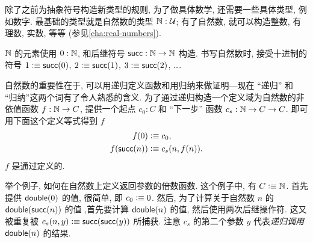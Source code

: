 %
%
%
除了之前为抽象符号构造新类型的规则, 为了做具体数学, 还需要一些具体类型, 例如数字.
最基础的类型就是自然数的类型 $\mathbb{N} : \mathcal{U}$;
有了自然数, 就可以构造整数, 有理数, 实数, 等等 (参见\cref{cha:real-numbers}).

$\mathbb{N}$ 的元素使用 $0 : \mathbb{N}$, 和后继符号 $\mathsf{succ} : \mathbb{N} \to \mathbb{N}$ 构造.
书写自然数时, 接受十进制的符号 $1 \vcentcolon\equiv \mathsf{succ}(0)$, $2 \vcentcolon\equiv \mathsf{succ}(1)$, $3 \vcentcolon\equiv \mathsf{succ}(2)$, \dots.

自然数的重要性在于, 可以用递归定义函数和用归纳来做证明---现在 ``递归'' 和 ``归纳''这两个词有了令人熟悉的含义.
%
为了通过递归构造一个定义域为自然数的非依值函数 $f : \mathbb{N} \to C$, 提供一个起点 $c_0 : C$ 和 ``下一步'' 函数 $c_s : \mathbb{N} \to C \to C$.
即可用下面这个定义等式得到 $f$
%
\begin{align*}
    f(0) &\vcentcolon\equiv c_0, \\
    f(\mathsf{succ}(n)) &\vcentcolon\equiv c_s(n,f(n)).
\end{align*}
$f$ 是通过定义的.
%
%

举个例子, 如何在自然数上定义返回参数的倍数函数.
这个例子中, 有 $C\vcentcolon\equiv \mathbb{N}$.
首先提供 $\mathsf{double}(0)$ 的值, 很简单, 即 $c_0 \vcentcolon\equiv 0$.
然后, 为了计算关于自然数 $n$ 的 $\mathsf{double}(\mathsf{succ}(n))$ 的值 ,首先要计算 $\mathsf{double}(n)$ 的值, 然后使用两次后继操作符.
这又被重复被 $c_s(n,y) \vcentcolon\equiv \mathsf{succ}(\mathsf{succ}(y))$ 所捕获.
注意 $c_s$ 的第二个参数 $y$ 代表\emph{递归调用} $\mathsf{double}(n)$ 的结果.

